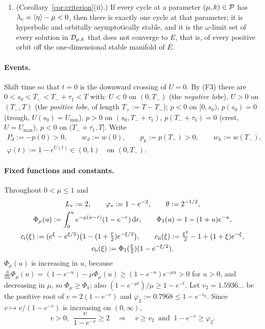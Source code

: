 \begin{enumerate}[label=\textup{(F\arabic*)}]
converges to a cycle. Here $W^s(E)$ is the one-dimensional stable manifold of $E$. In the original rates of \eqref{eq:physical} the hypothesis of the cited theorem is $r_0>a_0+b_0$, which is $k>\kH$, and the open positive octant of concentrations is $\Dom$ in the variables \eqref{eq:change}.
\item (Corollary~\ref{cor:criterion}\textup{(ii)}.) If every cycle at a parameter $(\mu,k)\in\mathcal P$ has $\lambda_c=\left\langle \eta\right\rangle-\mu<0$, then there is exactly one cycle at that parameter; it is hyperbolic and orbitally asymptotically stable, and it is the $\omega$-limit set of every solution in $\Dom$ that does not converge to $E$, that is, of every positive orbit off the one-dimensional stable manifold of $E$.
\end{enumerate}
\paragraph{Events.} Shift time so that $t=0$ is the downward crossing of $U=0$. By (F3) there are
$0<s_0<T_-<T_-+\tau_1<T$ with:
$U<0$ on $(0,T_-)$ (the \emph{negative lobe}), $U>0$ on $(T_-,T)$ (the \emph{positive lobe},
of length $T_+:=T-T_-$); $p<0$ on $[0,s_0)$, $p(s_0)=0$ (trough, $U(s_0)=U_{\min}$), $p>0$ on $(s_0,T_-+\tau_1)$,
$p(T_-+\tau_1)=0$ (crest, $U=U_{\max}$), $p<0$ on $(T_-+\tau_1,T]$. Write
\begin{gather*}
P_d:=-p(0)>0,\qquad w_d:=w(0),\qquad p_k:=p(T_-)>0,\qquad w_k:=w(T_-),\\
\varphi(t):=1-e^{U(t)}\in(0,1)\quad\text{on }(0,T_-).
\end{gather*}
\paragraph{Fixed functions and constants.} Throughout $0<\mu\le1$ and
\begin{gather*}
L_\ast:=2,\qquad \varphi_\ast:=1-e^{-2},\qquad \theta:=2^{-1/2},\\
\Phi_\mu(u):=\int_0^u e^{-\mu(u-r)}(1-e^{-r})\,\mathrm dr,\qquad \Phi_1(u)=1-(1+u)e^{-u},\\
c_{\rm i}(\xi):=(e^\xi-e^{\xi/2})\bigl(1-(1+\tfrac\xi2)e^{-\xi/2}\bigr),\qquad
c_{\rm ii}(\xi):=\tfrac{\xi^2}{2}-1+(1+\xi)e^{-\xi},\\
c_{\rm b}(\xi):=\Phi_1(\tfrac\xi2)(1-e^{-\xi/2}).
\end{gather*}
$\Phi_\mu(u)$ is increasing in $u$, because $\tfrac{\mathrm d}{\mathrm du}\Phi_\mu(u)=(1-e^{-u})-\mu\Phi_\mu(u)\ge(1-e^{-u})e^{-\mu u}>0$ for $u>0$, and decreasing in $\mu$, so $\Phi_\mu\ge\Phi_1$; also
$(1-e^{-\mu t})/\mu\ge1-e^{-t}$. Let $v_2=1.5936\ldots$ be the positive root of $v=2(1-e^{-v})$ and
$\varphi_2:=0.7968\le 1-e^{-v_2}$. Since $v\mapsto v/(1-e^{-v})$ is increasing on $(0,\infty)$,
\begin{equation}\label{lg:eq:v2}
v>0,\ \ \frac{v}{1-e^{-v}}\ge2\quad\Longrightarrow\quad v\ge v_2\ \text{ and }\ 1-e^{-v}\ge\varphi_2 .
\end{equation}

